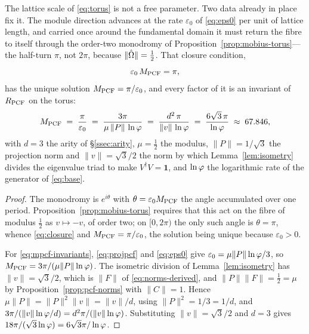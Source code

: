 \begin{proposition}\label{prop:mpcf-forced}
The lattice scale of \eqref{eq:torus} is not a free parameter. Two data already in place fix it.
The module direction advances at the rate $\varepsilon_0$ of \eqref{eq:eps0} per unit of lattice
length, and carried once around the fundamental domain it must return the fibre to itself through
the order-two monodromy of Proposition~\ref{prop:mobius-torus}---the half-turn $\pi$, not $2\pi$,
because $\lVert\hat{\Omega}\rVert=\tfrac12$. That closure condition,
\begin{equation}\label{eq:closure}
  \varepsilon_0\,M_{\mathrm{PCF}}=\pi ,
\end{equation}
has the unique solution $M_{\mathrm{PCF}}=\pi/\varepsilon_0$, and every factor of it is an invariant of
$R_{\mathrm{PCF}}$ on the torus:
\begin{equation}\label{eq:mpcf-invariants}
  M_{\mathrm{PCF}}\;=\;\frac{\pi}{\varepsilon_0}
  \;=\;\frac{3\pi}{\mu\,\lVert P\rVert\,\ln\varphi}
  \;=\;\frac{d^{2}\,\pi}{\lVert v\rVert\,\ln\varphi}
  \;=\;\frac{6\sqrt3\,\pi}{\ln\varphi}\;\approx\;67.846 ,
\end{equation}
with $d=3$ the arity of \S\ref{ssec:arity}, $\mu=\tfrac12$ the modulus, $\lVert P\rVert=1/\sqrt3$
the projection norm and $\lVert v\rVert=\sqrt3/2$ the norm by which Lemma~\ref{lem:isometry}
divides the eigenvalue triad to make $V^{\dagger}V=\mathbf1$, and $\ln\varphi$ the logarithmic rate
of the generator of \eqref{eq:base}.

\end{proposition}
\begin{proof}
The monodromy is $e^{i\theta}$ with $\theta=\varepsilon_0M_{\mathrm{PCF}}$ the angle accumulated over one
period. Proposition~\ref{prop:mobius-torus} requires that this act on the fibre of modulus
$\tfrac12$ as $v\mapsto-v$, of order two; on $[0,2\pi)$ the only such angle is $\theta=\pi$, whence
\eqref{eq:closure} and $M_{\mathrm{PCF}}=\pi/\varepsilon_0$, the solution being unique because
$\varepsilon_0>0$.

For \eqref{eq:mpcf-invariants}, \eqref{eq:projpcf} and \eqref{eq:eps0} give
$\varepsilon_0=\mu\lVert P\rVert\ln\varphi/3$, so $M_{\mathrm{PCF}}=3\pi/(\mu\lVert P\rVert\ln\varphi)$. The
isometric division of Lemma~\ref{lem:isometry} has $\lVert v\rVert=\sqrt3/2$, which is $\lVert
F\rVert$ of \eqref{eq:norms-derived}, and $\lVert P\rVert\lVert F\rVert=\tfrac12=\mu$ by
Proposition~\ref{prop:pcf-norms} with $\lVert C\rVert=1$. Hence
$\mu\lVert P\rVert=\lVert P\rVert^{2}\lVert v\rVert=\lVert v\rVert/d$, using
$\lVert P\rVert^{2}=1/3=1/d$, and $3\pi/(\lVert v\rVert\ln\varphi/d)=d^{2}\pi/(\lVert
v\rVert\ln\varphi)$. Substituting $\lVert v\rVert=\sqrt3/2$ and $d=3$ gives
$18\pi/(\sqrt3\ln\varphi)=6\sqrt3\pi/\ln\varphi$.
\end{proof}

